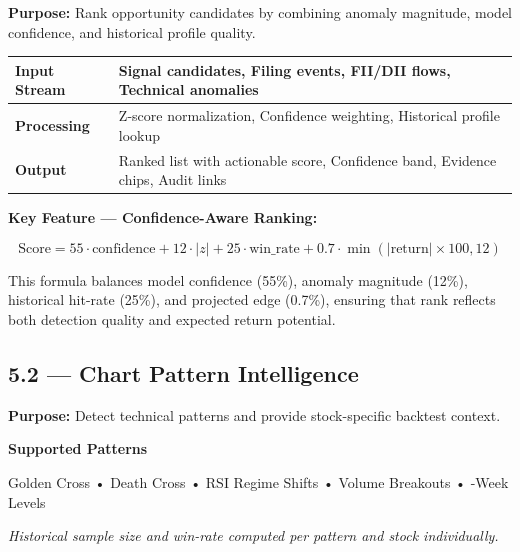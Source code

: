 \documentclass[11pt,a4paper]{article}
\begin{document}
\textbf{Purpose:} Rank opportunity candidates by combining anomaly magnitude, model confidence, and historical profile quality.

\vspace{0.3cm}

{\centering\small
\begin{tabular}{|p{1.6cm}|p{4.2cm}|}
\hline
\rowcolor{mn-light}
\textbf{Input Stream} & Signal candidates, Filing events, FII/DII flows, Technical anomalies \\
\hline
\textbf{Processing} & Z-score normalization, Confidence weighting, Historical profile lookup \\
\hline
\textbf{Output} & Ranked list with actionable score, Confidence band, Evidence chips, Audit links \\
\hline
\end{tabular}
\par}

\vspace{0.5cm}

\textbf{Key Feature — Confidence-Aware Ranking:}

\begin{equation}
\text{Score} = 55 \cdot \text{confidence} + 12 \cdot |z| + 25 \cdot \text{win\_rate} + 0.7 \cdot \min(|\text{return}| \times 100, 12)
\end{equation}

This formula balances model confidence (55\%), anomaly magnitude (12\%), historical hit-rate (25\%), and projected edge (0.7\%), ensuring that rank reflects both detection quality and expected return potential.

\subsection{5.2 — Chart Pattern Intelligence}

\textbf{Purpose:} Detect technical patterns and provide stock-specific backtest context.

\vspace{0.3cm}

\begin{tcolorbox}[colback=mn-light, colframe=mn-slate, arc=1mm, boxsep=8pt]
\small\textbf{Supported Patterns}

Golden Cross \quad • \quad Death Cross \quad • \quad RSI Regime Shifts \quad • \quad Volume Breakouts \quad • -Week Levels

\small \textit{Historical sample size and win-rate computed per pattern and stock individually.}
\end{tcolorbox}
\end{document}
